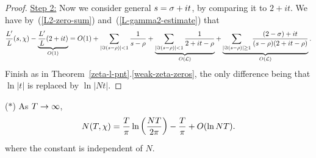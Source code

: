 \begin{proof}
\noindent\underline{Step 2:} Now we consider general $s=\sigma+it$, by comparing it to $2+it$. We have by~(\ref{L2-zero-sum}) and~(\ref{L-gamma2-estimate}) that
\[
\frac{L'}{L}(s,\chi)-\underbrace{\frac{L'}{L}(2+it)}_{O(1)}
=O(1)+
\sum_{|\Im(s-\rho)|<1}\frac{1}{s-\rho}+\underbrace{\sum_{|\Im(s-\rho)|<1}\frac{1}{2+it-\rho}}_{O(\mathcal{L})}+
\underbrace{\sum_{|\Im(s-\rho)|\ge1}\frac{(2-\sigma)+it}{(s-\rho)(2+it-\rho)}}_{O(\mathcal{L})}.
\]
Finish as in Theorem~\ref{zeta-l-pnt}.\ref{weak-zeta-zeros}, the only difference being that $\ln|t|$ is replaced by $\ln|Nt|$.
%
\end{proof}
\begin{thm}($*$) 
As $T\to \infty$,
\[
N(T,\chi)=\frac{T}{\pi}\ln\left( {\frac{NT}{2\pi}} \right)-\frac{T}{\pi}+O(\ln NT).
\]
where the constant is independent of $N$.
\end{thm}
